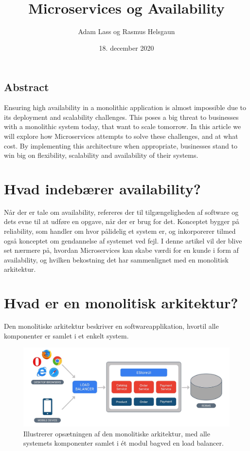 \documentclass{article}
\title{Microservices og Availability}
\author{Adam Lass og Rasmus Helsgaun}
\date{18. december 2020}
\begin{document}
\maketitle
\begin{flushleft}
\subsection*{Abstract}
Ensuring high availability in a monolithic application is almost impossible due to its deployment and scalability challenges. This poses a big threat to businesses with a monolithic system today, that want to scale tomorrow. In this article we will explore how Microservices attempts to solve these challenges, and at what cost. By implementing this architecture when appropriate, businesses stand to win big on flexibility, scalability and availability of their systems.

\section*{Hvad indebærer availability?}
Når der er tale om availability, refereres der til tilgængeligheden af software og dets evne til at udføre en opgave, når der er brug for det. Konceptet bygger på reliability, som handler om hvor pålidelig et system er, og inkorporerer tilmed også konceptet om gendannelse af systemet ved fejl. I denne artikel vil der blive set nærmere på, hvordan Microservices kan skabe værdi for en kunde i form af availability, og hvilken bekostning det har sammenlignet med en monolitisk arkitektur.

\section*{Hvad er en monolitisk arkitektur?}
Den monolitiske arkitektur beskriver en softwareapplikation, hvortil alle komponenter er samlet i et enkelt system. \linebreak

\begin{figure}[H]
    \captionsetup{justification=raggedright,singlelinecheck=false}
    \includegraphics[width=\textwidth]{monolithic load balance.jpeg}
    \caption{Illustrerer opsætningen af den monolitiske arkitektur, med alle systemets komponenter samlet i ét modul bagved en load balancer.\cite{mono2} \label{figure:mono load balance}}
\end{figure}


\end{flushleft}
\end{document}
